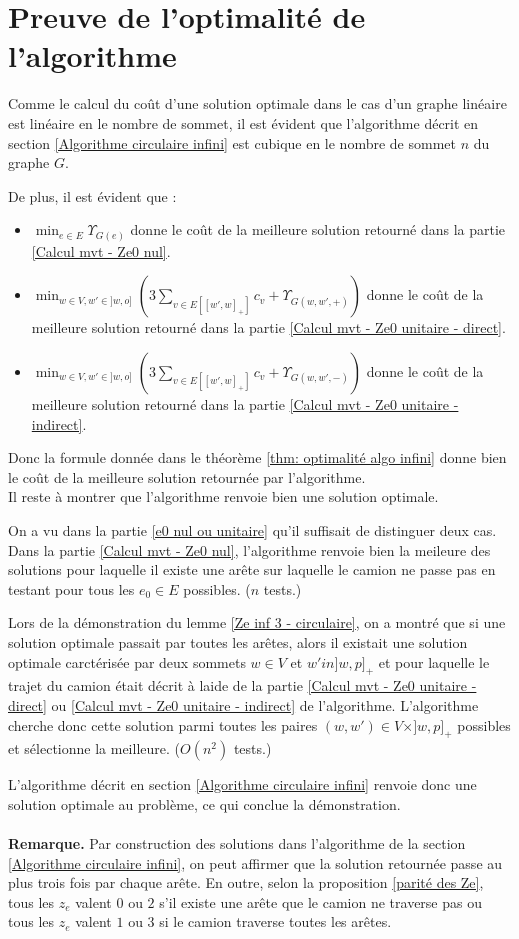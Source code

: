 \section{Preuve de l'optimalité de l'algorithme}

Comme le calcul du coût d'une solution optimale dans le cas d'un graphe linéaire est linéaire en le nombre de sommet, il est évident que l'algorithme décrit en section \ref{Algorithme circulaire infini} est cubique en le nombre de sommet $n$ du graphe $G$.

De plus, il est évident que :
\begin{itemize}
\item $\min_{e \in E} \Upsilon_{G(e)}$ donne le coût de la meilleure solution retourné dans la partie \ref{Calcul mvt - Ze0 nul}.
\item $\min_{w \in V, w' \in ]w,o]} \left(3 \sum_{ v \in E\left[ \left[w',w\right]_+ \right] }c_v + \Upsilon_{G(w,w',+)}\right)$ donne le coût de la meilleure solution retourné dans la partie \ref{Calcul mvt - Ze0 unitaire - direct}.
\item $\min_{w \in V, w' \in ]w,o]} \left(3 \sum_{ v \in E\left[ \left[w',w\right]_+ \right] }c_v + \Upsilon_{G(w,w',-)}\right)$ donne le coût de la meilleure solution retourné dans la partie \ref{Calcul mvt - Ze0 unitaire - indirect}.
\end{itemize}
Donc la formule donnée dans le théorème \ref{thm: optimalité algo infini} donne bien le coût de la meilleure solution retournée par l'algorithme.
\\

Il reste à montrer que l'algorithme renvoie bien une solution optimale.

On a vu dans la partie \ref{e0 nul ou unitaire} qu'il suffisait de distinguer deux cas. Dans la partie \ref{Calcul mvt - Ze0 nul}, l'algorithme renvoie bien la meileure des solutions pour laquelle il existe une arête sur laquelle le camion ne passe pas en testant pour tous les $e_0 \in E$ possibles. ($n$ tests.)

Lors de la démonstration du lemme \ref{Ze inf 3 - circulaire}, on a montré que si une solution optimale passait par toutes les arêtes, alors il existait une solution optimale carctérisée par deux sommets $w \in V$ et $w' in ]w,p]_+$ et pour laquelle le trajet du camion était décrit à laide de la partie \ref{Calcul mvt - Ze0 unitaire - direct} ou \ref{Calcul mvt - Ze0 unitaire - indirect} de l'algorithme. L'algorithme cherche donc cette solution parmi toutes les paires $(w,w') \in V\times ]w,p]_+$ possibles et sélectionne la meilleure. ($O(n^2)$ tests.)

L'algorithme décrit en section \ref{Algorithme circulaire infini} renvoie donc une solution optimale au problème, ce qui conclue la démonstration.
\\
\\
\textbf{Remarque.} Par construction des solutions dans l'algorithme de la section \ref{Algorithme circulaire infini}, on peut affirmer que la solution retournée passe au plus trois fois par chaque arête. En outre, selon la proposition \ref{parité des Ze}, tous les $z_e$ valent $0$ ou $2$ s'il existe une arête que le camion ne traverse pas ou tous les $z_e$ valent $1$ ou $3$ si le camion traverse toutes les arêtes.